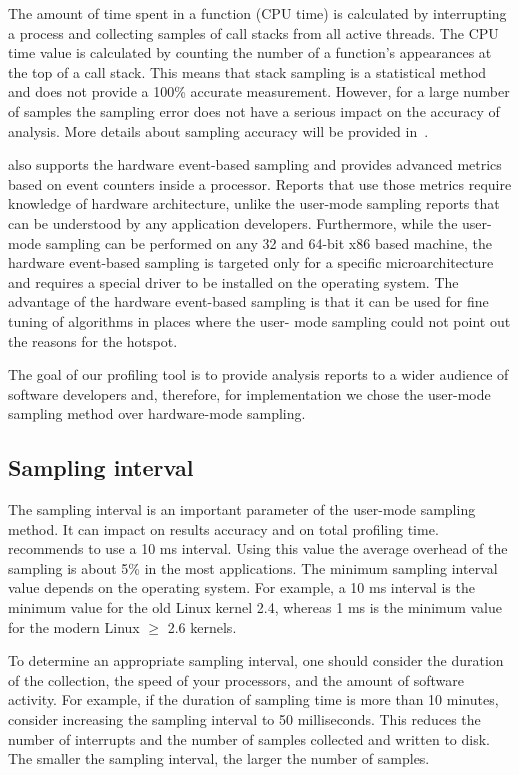 The amount of time spent in a function (CPU time) is calculated by interrupting
a process and collecting samples of call stacks from all active threads. The CPU
time value is calculated by counting the number of  a function's appearances at
the top of a call stack. This means that stack sampling is a statistical method
and does not provide a 100\% accurate measurement. However, for a large number
of samples the sampling error does not have a serious impact on the accuracy of
analysis. More details about sampling accuracy will be provided
in~.

\amp also supports the hardware event-based sampling and provides advanced
metrics based on event counters inside a processor. Reports that use those
metrics require  knowledge of hardware architecture, unlike the user-mode
sampling reports that can be understood by any application developers.
Furthermore, while the user-mode sampling can be performed on any 32 and 64-bit
x86 based machine, the hardware event-based sampling is targeted only for a
specific \intel microarchitecture and requires a special driver to be installed
on the operating system. The advantage of the hardware event-based sampling is 
that it can be used for fine tuning of algorithms in places where  the user-
mode sampling could not point out the reasons for the hotspot.

The goal of our profiling tool is to provide analysis reports to a wider
audience of software developers and, therefore, for implementation we chose the
user-mode sampling method over hardware-mode sampling.

\subsection{Sampling interval}

The sampling interval is an important parameter of the user-mode sampling
method. It can impact on results accuracy and on total profiling time. \intel
recommends to use a 10 ms interval. Using this value the average overhead of
the sampling is about 5\% in the most applications. The minimum sampling
interval value depends on the operating system. For example, a 10 ms interval
is the minimum value for the old Linux kernel 2.4, whereas 1 ms is the minimum
value for the modern Linux $\ge$ 2.6 kernels.

To determine an appropriate sampling interval, one should consider the duration of the
collection, the speed of your processors, and the amount of software activity.
For example, if the duration of sampling time is more than 10 minutes, consider
increasing the sampling interval to 50 milliseconds. This reduces the number of
interrupts and the number of samples collected and written to disk. The smaller
the sampling interval, the larger the number of samples.

